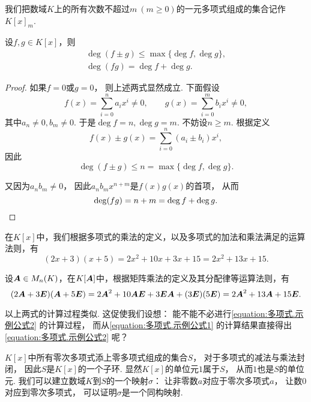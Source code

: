 我们把数域\(K\)上的所有次数不超过\(m\ (m\geq0)\)的一元多项式组成的集合记作\(K[x]_m\).

\begin{proposition}
设\(f,g \in K[x]\)，则\begin{gather}
	\deg(f \pm g) \leq \max\{\deg f, \deg g\},
	\label{equation:多项式.和的次数} \\
	\deg(fg) = \deg f + \deg g.
	\label{equation:多项式.积的次数}
\end{gather}
\begin{proof}
如果\(f=0\)或\(g=0\)，
则上述两式显然成立.
下面假设\[
	f(x)
	= \sum_{i=0}^n a_i x^i
	\neq0, \qquad
	g(x)
	= \sum_{i=0}^m b_i x^i
	\neq0,
\]
其中\(a_n\neq0,b_m\neq0\).
于是\(\deg f=n,
\deg g=m\).
不妨设\(n \geq m\).
根据定义\[
	f(x) \pm g(x)
	= \sum_{i=0}^n (a_i \pm b_i) x^i,
\]
因此\[
	\deg(f \pm g)
	\leq n
	= \max\{
		\deg f,
		\deg g
	\}.
\]

又因为\(a_n b_m \neq 0\)，
因此\(a_n b_m x^{n+m}\)是\(f(x) g(x)\)的首项，
从而\[
	\deg(fg) = n+m = \deg f + \deg g.
	\qedhere
\]
\end{proof}
\end{proposition}

在\(K[x]\)中，我们根据多项式的乘法的定义，以及多项式的加法和乘法满足的运算法则，有
\begin{equation}\label{equation:多项式.示例公式1}
	(2x+3)(x+5)
	=2x^2+10x+3x+15
	=2x^2+13x+15.
\end{equation}

设\(\boldsymbol{A} \in M_n(K)\)，在\(K[\boldsymbol{A}]\)中，根据矩阵乘法的定义及其分配律等运算法则，有
\begin{equation}\label{equation:多项式.示例公式2}
	(2\boldsymbol{A}+3\boldsymbol{E})(\boldsymbol{A}+5\boldsymbol{E})
	=2\boldsymbol{A}^2+10\boldsymbol{A}\boldsymbol{E}+3\boldsymbol{E}\boldsymbol{A}+(3\boldsymbol{E})(5\boldsymbol{E})
	=2\boldsymbol{A}^2+13\boldsymbol{A}+15\boldsymbol{E}.
\end{equation}

以上两式的计算过程类似.
这促使我们设想：
能不能不必进行\cref{equation:多项式.示例公式2} 的计算过程，
而从\cref{equation:多项式.示例公式1}
的计算结果直接得出\cref{equation:多项式.示例公式2} 呢？

\(K[x]\)中所有零次多项式添上零多项式组成的集合\(S\)，
对于多项式的减法与乘法封闭，
因此\(S\)是\(K[x]\)的一个子环.
显然\(K[x]\)的单位元\(1\)属于\(S\)，
从而\(1\)也是\(S\)的单位元.
我们可以建立数域\(K\)到\(S\)的一个映射\(\sigma\)：
让非零数\(a\)对应于零次多项式\(a\)，
让数\(0\)对应到零次多项式，
可以证明\(\sigma\)是一个同构映射.

